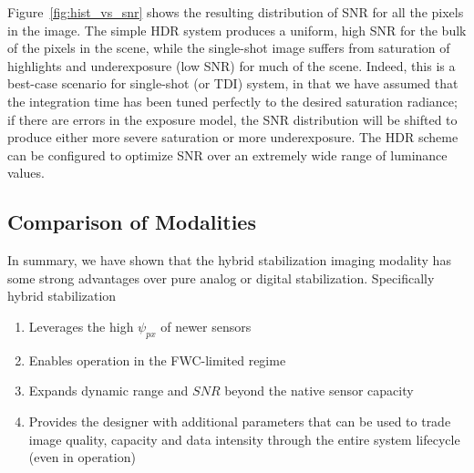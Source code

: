 \documentclass[10pt,journal]{IEEEtran}  %
\begin{document}
Figure~\ref{fig:hist_vs_snr} shows the resulting distribution of SNR for all the pixels in the image. The simple HDR system produces a uniform, high SNR for the bulk of the pixels in the scene, while the single-shot image suffers from saturation of highlights and underexposure (low SNR) for much of the scene. Indeed, this is a best-case scenario for single-shot (or TDI) system, in that we have assumed that the integration time has been tuned perfectly to the desired saturation radiance; if there are errors in the exposure model, the SNR distribution will be shifted to produce either more severe saturation or more underexposure. The HDR scheme can be configured to optimize SNR over an extremely wide range of luminance values.




\subsection{Comparison of Modalities}
In summary, we have shown that the hybrid stabilization imaging modality has some strong advantages over pure analog or digital stabilization.  Specifically hybrid stabilization

\begin{enumerate}
\item Leverages the high $\psi_{px}$ of newer sensors 
\item Enables operation in the FWC-limited regime 
\item Expands dynamic range and $SNR$ beyond the native sensor capacity 
\item Provides the designer with additional parameters that can be used to trade image quality, capacity and data intensity through the entire system lifecycle (even in operation)
\end{enumerate}
\end{document}
